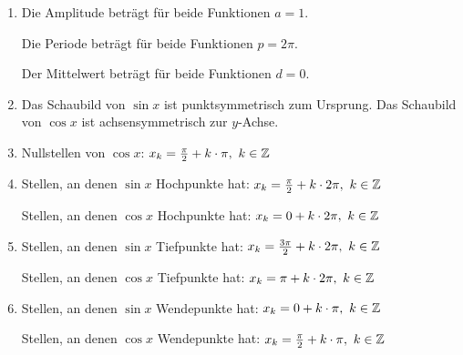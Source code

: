 \begin{Answer}[ref=eigenschaftenSinCosA1]
	\begin{enumerate}[label=\alph*)]
		\item Die Amplitude beträgt für beide Funktionen \(a=1\).

		Die Periode beträgt für beide Funktionen \(p=2\pi\).

		Der Mittelwert beträgt für beide Funktionen \(d=0\).
		\item Das Schaubild von \(\sin x\) ist punktsymmetrisch zum Ursprung. Das Schaubild von \(\cos x\) ist achsensymmetrisch zur \(y\)-Achse.
		\item Nullstellen von \(\cos x\): \(x_k=\frac{\pi}{2}+k\cdot \pi,\ k\in\Z\)
		\item Stellen, an denen \(\sin x\) Hochpunkte hat: 	\(x_k=\frac{\pi}{2}+k\cdot 2\pi,\ k\in\mathbb{Z}\)

		Stellen, an denen \(\cos x\) Hochpunkte hat: 	\(x_k=0+k\cdot 2\pi,\ k\in\Z\)
		\item Stellen, an denen \(\sin x\) Tiefpunkte hat: 	\(x_k=\frac{3\pi}{2}+k\cdot 2\pi,\ k\in\mathbb{Z}\)

		Stellen, an denen \(\cos x\) Tiefpunkte hat: 	\(x_k=\pi+k\cdot 2\pi,\ k\in\Z\)
		\item Stellen, an denen \(\sin x\) Wendepunkte hat: 	\(x_k=0+k\cdot \pi,\ k\in\Z\)

		Stellen, an denen \(\cos x\) Wendepunkte hat: 	\(x_k=\frac{\pi}{2}+k\cdot \pi,\ k\in\Z\)
	\end{enumerate}
\end{Answer}